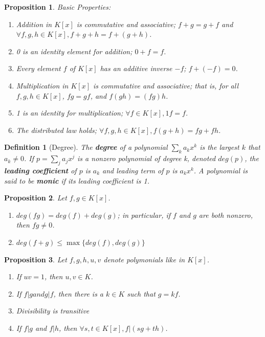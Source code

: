 \documentclass[12pt]{article}
\newtheorem{definition}{Definition}[subsection]
\newtheorem{proposition}{Proposition}[subsection]
\begin{document}
    \begin{proposition}
        Basic Properties:\\
        \begin{enumerate}
            \item Addition in $K[x]$ is commutative and associative; $f+g=g+f$ and $\forall f,g,h \in K[x], f+g+h=f+(g+h)$.
            \item 0 is an identity element for addition; $0+f = f$.
            \item Every element $f$ of $K[x]$ has an additive inverse $-f$; $f + (-f) = 0$.
            \item Multiplication in $K[x]$  is commutative and associative; that is, for all $f, g, h \in K[x]$, $fg=gf$, and $f(gh)=(fg)h$.
            \item 1 is an identity for multiplication; $\forall f \in K[x], 1f=f$.
            \item The distributed law holds; $\forall f, g, h \in K[x], f(g+h)=fg+fh$.
        \end{enumerate}

    \end{proposition}
    \begin{definition}[Degree]
        The \textbf{degree} of a polynomial $\sum_k a_kx^k$ is the largest $k$ that $a_k \neq 0$. If $p=\sum_j a_jx^j$ is a nonzero polynomial of degree k, denoted $deg(p)$, the \textbf{leading coefficient} of $p$ is $a_k$ and leading term of $p$ is $a_kx^k$. A polynomial is said to be \textbf{monic} if its leading coefficient is 1.   
    \end{definition}
    \begin{proposition}
        Let $f,g \in K[x]$.
        \begin{enumerate}
            \item $deg(fg)=deg(f)+deg(g)$; in particular, if $f$ and $g$ are both nonzero, then $fg \neq 0$.
            \item $deg(f+g) \leq \max\{deg(f), deg(g)\}$
        \end{enumerate}
    \end{proposition}
    
    \begin{proposition}
        Let $f, g, h, u, v$ denote polymonials like in $K[x]$.
        \begin{enumerate}
            \item If $uv = 1$, then $u, v \in K$.
            \item If $f|g and g|f$, then there is a $k \in K$ such that $g = kf$.
            \item Divisibility is transitive
            \item If $f|g$ and $f|h$, then $\forall s, t \in K[x], f|(sg+th)$.
        \end{enumerate}
    \end{proposition}
\end{document}
